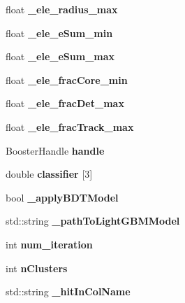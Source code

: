 \begin{DoxyCompactItemize}
\item 
float {\bfseries \-\_\-ele\-\_\-radius\-\_\-max}\label{classCALICE_1_1TBParticleID_a7c097f6916335c41eb0c5525fcc82d70}

\item 
float {\bfseries \-\_\-ele\-\_\-e\-Sum\-\_\-min}\label{classCALICE_1_1TBParticleID_ab3b6f511ee5652dbf565aeab418d6f03}

\item 
float {\bfseries \-\_\-ele\-\_\-e\-Sum\-\_\-max}\label{classCALICE_1_1TBParticleID_a208561b349fb4fe0851ef80bfcec713b}

\item 
float {\bfseries \-\_\-ele\-\_\-frac\-Core\-\_\-min}\label{classCALICE_1_1TBParticleID_aeb4d044983487d07a79f042de81dfc59}

\item 
float {\bfseries \-\_\-ele\-\_\-frac\-Det\-\_\-max}\label{classCALICE_1_1TBParticleID_aa1734c1630b08976098ac68a5393ed9d}

\item 
float {\bfseries \-\_\-ele\-\_\-frac\-Track\-\_\-max}\label{classCALICE_1_1TBParticleID_acfe9762e7242a023f66c3c840ebd3c96}

\item 
Booster\-Handle {\bfseries handle}\label{classCALICE_1_1TBParticleID_a30f6a7c76f4107d3e5b04c4ce2d0c5fa}

\item 
double {\bfseries classifier} [3]\label{classCALICE_1_1TBParticleID_a69e12d5fb20171f7cc67884c44613154}

\item 
bool {\bfseries \-\_\-apply\-B\-D\-T\-Model}\label{classCALICE_1_1TBParticleID_ac6e50fe1b6dcbfeae3e2d718e5a0f473}

\item 
std\-::string {\bfseries \-\_\-path\-To\-Light\-G\-B\-M\-Model}\label{classCALICE_1_1TBParticleID_a6f72252c17fd450457539dd5643e0f1c}

\item 
int {\bfseries num\-\_\-iteration}\label{classCALICE_1_1TBParticleID_a41e94e1e4e9e30088aa2ee8429f40a8d}

\item 
int {\bfseries n\-Clusters}\label{classCALICE_1_1TBParticleID_a9900a74e85428531deaa4799ae3a5a44}

\item 
std\-::string {\bfseries \-\_\-hit\-In\-Col\-Name}\label{classCALICE_1_1TBParticleID_a163e9fd15d9f7c30d1950c71872d7483}


\end{DoxyCompactItemize}
